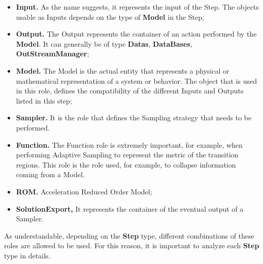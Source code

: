 \begin{itemize}
\item \textbf{Input.} As the name suggests, it represents the input of the Step. The objects usable as Inputs depends on the type of \textbf{Model} in the Step;
\item \textbf{Output.} The Output represents the container of an action performed by the \textbf{Model}. It can generally be of type \textbf{Datas}, \textbf{DataBases}, \textbf{OutStreamManager};
\item \textbf{Model.} The Model is the actual entity that represents a physical or mathematical representation of a system or behavior. The object that is used in this role, defines the compatibility of the different Inputs and Outputs listed in this step;
\item \textbf{Sampler.} It is the role that defines the Sampling strategy that needs to be performed. 
\item \textbf{Function.} The Function role is extremely important, for example, when performing Adaptive Sampling to represent the metric of the transition regions. This role is the role used, for example, to collapse information coming from a Model.
\item \textbf{ROM.} Acceleration Reduced Order Model;
\item \textbf{SolutionExport,} It represents the container of the eventual output of a Sampler.
\end{itemize}
As understandable, depending on the \textbf{Step} type, different combinations of these roles are allowed to be used.
For this reason, it is important to analyze each \textbf{Step} type in details.
